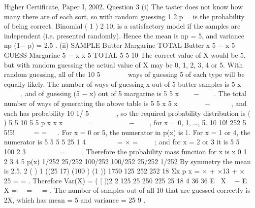 \documentclass[a4paper,12pt]{article}
\begin{document}
Higher Certificate, Paper I, 2002. Question 3
(i) The taster does not know how many there are of each sort, so with random
guessing 1
2 p = is the probability of being correct. Binomial ( 1 )
2 10, is a satisfactory
model if the samples are independent (i.e. presented randomly). Hence the mean is np
= 5, and variance np (1− p) = 2.5 .
(ii) SAMPLE
Butter Margarine TOTAL
Butter x 5 − x 5
GUESS Margarine 5 − x x 5
TOTAL 5 5 10
The correct value of X would be 5, but with random guessing the actual value of X
may be 0, 1, 2, 3, 4 or 5. With random guessing, all of the
10
5
 
 
 
ways of guessing 5
of each type will be equally likely. The number of ways of guessing x out of 5 butter
samples is
5
x
 
 
 
, and of guessing (5 − x) out of 5 margarine is
5
5 x
 
 −   
. The total
number of ways of generating the above table is
5 5
x 5 x
  
  −    
, and each has probability
10
1/
5
 
 
 
, so the required probability distribution is ( ) 5 5 10
5 5
p x
x x
    
=        −   
, for
x = 0, 1, …, 5.
10 10! 252
5 5!5!
 
  = =
 
. For x = 0 or 5, the numerator in p(x) is 1. For x = 1 or 4, the
numerator is
5 5
5 5 25
1 4
  
   = × =
  
; and for x = 2 or 3 it is
5 5
100
2 3
  
    =
  
. Therefore the
probability mass function for x is
x 0 1 2 3 4 5
p(x) 1/252 25/252 100/252 100/252 25/252 1/252
By symmetry the mean is 2.5.
2 ( ) 1 ((25 17) (100 ) (1 )) 1750 125
252 252 18
Σx p x = × + ×13 + × 25 = = .
Therefore Var(X) = ( [ ])2 2 125 25 250 225 25
18 4 36 36
E X  − E X = − = − = .
The number of samples out of all 10 that are guessed correctly is 2X, which has mean
= 5 and variance = 25
9
.
\end{document}
